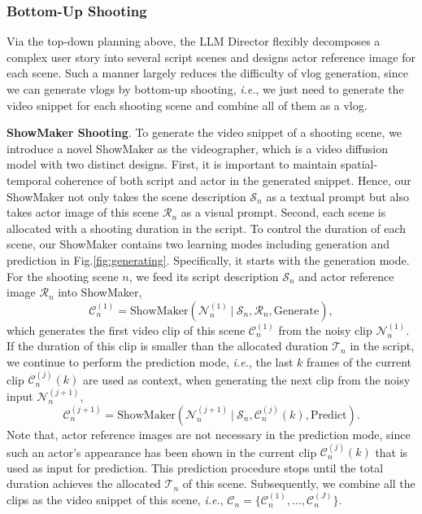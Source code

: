 \subsubsection{Bottom-Up Shooting}
\label{sec:Bottom-Up}

Via the top-down planning above,
the LLM Director flexibly decomposes a complex user story into several script scenes 
and designs actor reference image for each scene.
Such a manner largely reduces the difficulty of vlog generation,
since we can generate vlogs by bottom-up shooting,
\textit{i.e.},
we just need to generate the video snippet for each shooting scene and combine all of them as a vlog.

\textbf{ShowMaker Shooting}.
To generate the video snippet of a shooting scene,
we introduce a novel ShowMaker as the videographer,
which is a video diffusion model with two distinct designs.
First,
it is important to maintain spatial-temporal coherence of both script and actor in the generated snippet.
Hence,
our ShowMaker not only takes the scene description $\mathcal{S}_{n}$ as a textual prompt 
but also takes actor image of this scene $\mathcal{R}_{n}$ as a visual prompt.
Second,
each scene is allocated with a shooting duration in the script.
To control the duration of each scene,
our ShowMaker contains two learning modes including generation and prediction in Fig.\ref{fig:generating}.
Specifically,
it starts with the generation mode.
For the shooting scene $n$,
we feed its script description $\mathcal{S}_{n}$ and actor reference image $\mathcal{R}_{n}$ into ShowMaker,
\begin{equation}
\mathcal{C}_{n}^{(1)}=\text{ShowMaker}(\mathcal{N}_{n}^{(1)}~|~\mathcal{S}_{n},\mathcal{R}_{n},\text{Generate}),
\label{eq:showmakergeneration}    
\end{equation}
which generates the first video clip of this scene $\mathcal{C}_{n}^{(1)}$ from the noisy clip $\mathcal{N}_{n}^{(1)}$.
If the duration of this clip is smaller than the allocated duration $\mathcal{T}_{n}$ in the script,
we continue to perform the prediction mode, %
\textit{i.e.},
the last $k$ frames of the current clip $\mathcal{C}_{n}^{(j)}(k)$ are used as context,
when generating the next clip from the noisy input $\mathcal{N}_{n}^{(j+1)}$,
\begin{equation}
\mathcal{C}_{n}^{(j+1)}=\text{ShowMaker}(\mathcal{N}_{n}^{(j+1)}~|~\mathcal{S}_{n},\mathcal{C}_{n}^{(j)}(k),\text{Predict}).
\label{eq:showmakerprediction}    
\end{equation}
Note that,
actor reference images are not necessary in the prediction mode,
since such an actor's appearance has been shown in the current clip $\mathcal{C}_{n}^{(j)}(k)$ that is used as input for prediction.
This prediction procedure stops until the total duration achieves the allocated $\mathcal{T}_{n}$ of this scene.
Subsequently,
we combine all the clips as the video snippet of this scene, \textit{i.e.}, $\mathcal{C}_{n}=\{\mathcal{C}_{n}^{(1)},...,\mathcal{C}_{n}^{(J)}\}$.



